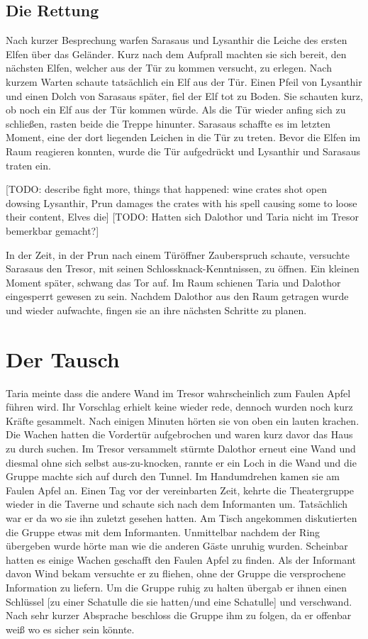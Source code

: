 \documentclass[10pt,twoside,twocolumn,openany]{book}
\begin{document}
	\subsection{Die Rettung}
	
	Nach kurzer Besprechung warfen Sarasaus und Lysanthir die Leiche des ersten Elfen über das Geländer. Kurz nach dem Aufprall machten sie sich bereit, den nächsten Elfen, welcher aus der Tür zu kommen versucht, zu erlegen. Nach kurzem Warten schaute tatsächlich ein Elf aus der Tür. Einen Pfeil von Lysanthir und einen Dolch von Sarasaus später, fiel der Elf tot zu Boden. Sie schauten kurz, ob noch ein Elf aus der Tür kommen würde. Als die Tür wieder anfing sich zu schließen, rasten beide die Treppe hinunter. Sarasaus schaffte es im letzten Moment, eine der dort liegenden Leichen in die Tür zu treten. Bevor die Elfen im Raum reagieren konnten, wurde die Tür aufgedrückt und Lysanthir und Sarasaus traten ein.
	
	
	[TODO: describe fight more, things that happened: wine crates shot open dowsing Lysanthir, Prun damages the crates with his spell causing some to loose their content, Elves die]
	[TODO: Hatten sich Dalothor und Taria nicht im Tresor bemerkbar gemacht?]
	
	In der Zeit, in der Prun nach einem Türöffner Zauberspruch schaute, versuchte Sarasaus den Tresor, mit seinen Schlossknack-Kenntnissen, zu öffnen. Ein kleinen Moment später, schwang das Tor auf. Im Raum schienen Taria und Dalothor eingesperrt gewesen zu sein. Nachdem Dalothor aus den Raum getragen wurde und wieder aufwachte, fingen sie an ihre nächsten Schritte zu planen. 
	
	\section{Der Tausch}
	
	Taria meinte dass die andere Wand im Tresor wahrscheinlich zum Faulen Apfel führen wird. Ihr Vorschlag erhielt keine wieder rede, dennoch wurden noch kurz Kräfte gesammelt. Nach einigen Minuten hörten sie von oben ein lauten krachen. Die Wachen hatten die Vordertür aufgebrochen und waren kurz davor das Haus zu durch suchen. Im Tresor versammelt stürmte Dalothor erneut eine Wand und diesmal ohne sich selbst aus-zu-knocken, rannte er ein Loch in die Wand und die Gruppe machte sich auf durch den Tunnel. Im Handumdrehen kamen sie am Faulen Apfel an. Einen Tag vor der vereinbarten Zeit, kehrte die Theatergruppe wieder in die Taverne und schaute sich nach dem Informanten um. Tatsächlich war er da wo sie ihn zuletzt gesehen hatten. Am Tisch angekommen diskutierten die Gruppe etwas mit dem Informanten. Unmittelbar nachdem der Ring übergeben wurde hörte man wie die anderen Gäste unruhig wurden. Scheinbar hatten es einige Wachen geschafft den Faulen Apfel zu finden. Als der Informant davon Wind bekam versuchte er zu fliehen, ohne der Gruppe die versprochene Information zu liefern. Um die Gruppe ruhig zu halten übergab er ihnen einen Schlüssel [zu einer Schatulle die sie hatten/und eine Schatulle] und verschwand. Nach sehr kurzer Absprache beschloss die Gruppe ihm zu folgen, da er offenbar weiß wo es sicher sein könnte.
	
\end{document}

